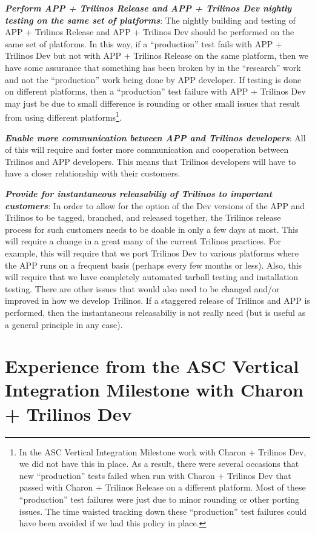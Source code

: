 \documentclass[pdf,ps2pdf,11pt]{SANDreport}
\begin{document}
{}\textit{\textbf{Perform APP + Trilinos Release and APP + Trilinos Dev
nightly testing on the same set of platforms}}: The nightly building and
testing of APP + Trilinos Release and APP + Trilinos Dev should be performed
on the same set of platforms.  In this way, if a ``production'' test fails
with APP + Trilinos Dev but not with APP + Trilinos Release on the same
platform, then we have some assurance that something has been broken by in the
``research'' work and not the ``production'' work being done by APP developer.
If testing is done on different platforms, then a ``production'' test failure
with APP + Trilinos Dev may just be due to small difference is rounding or
other small issues that result from using different platforms\footnote{In the
ASC Vertical Integration Milestone work with Charon + Trilinos Dev, we did not
have this in place.  As a result, there were several occasions that new
``production'' tests failed when run with Charon + Trilinos Dev that passed
with Charon + Trilinos Release on a different platform.  Most of these
``production'' test failures were just due to minor rounding or other porting
issues.  The time waisted tracking down these ``production'' test failures
could have been avoided if we had this policy in place.}.

{}\textit{\textbf{Enable more communication between APP and Trilinos
developers}}: All of this will require and foster more communication and
cooperation between Trilinos and APP developers.  This means that Trilinos
developers will have to have a closer relationship with their customers.

{}\textit{\textbf{Provide for instantaneous releasabiliy of Trilinos to
important customers}}: In order to allow for the option of the Dev versions of
the APP and Trilinos to be tagged, branched, and released together, the
Trilinos release process for such customers needs to be doable in only a few
days at most.  This will require a change in a great many of the current
Trilinos practices.  For example, this will require that we port Trilinos Dev
to various platforms where the APP runs on a frequent basis (perhaps every few
months or less).  Also, this will require that we have completely automated
tarball testing and installation testing.  There are other issues that would
also need to be changed and/or improved in how we develop Trilinos.  If a
staggered release of Trilinos and APP is performed, then the instantaneous
releasabiliy is not really need (but is useful as a general principle in any
case).


%
\section{Experience from the ASC Vertical Integration Milestone with Charon + Trilinos Dev}
%
\end{document}
